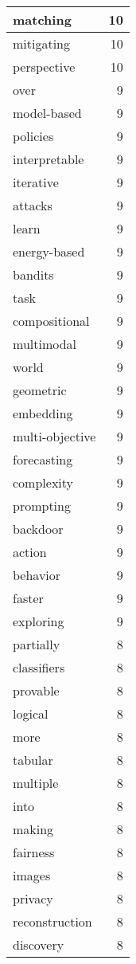\begin{table}[h]
\begin{tabular}{|l|r|}
\hline
matching & 10 \\
\hline
mitigating & 10 \\
\hline
perspective & 10 \\
\hline
over & 9 \\
\hline
model-based & 9 \\
\hline
policies & 9 \\
\hline
interpretable & 9 \\
\hline
iterative & 9 \\
\hline
attacks & 9 \\
\hline
learn & 9 \\
\hline
energy-based & 9 \\
\hline
bandits & 9 \\
\hline
task & 9 \\
\hline
compositional & 9 \\
\hline
multimodal & 9 \\
\hline
world & 9 \\
\hline
geometric & 9 \\
\hline
embedding & 9 \\
\hline
multi-objective & 9 \\
\hline
forecasting & 9 \\
\hline
complexity & 9 \\
\hline
prompting & 9 \\
\hline
backdoor & 9 \\
\hline
action & 9 \\
\hline
behavior & 9 \\
\hline
faster & 9 \\
\hline
exploring & 9 \\
\hline
partially & 8 \\
\hline
classifiers & 8 \\
\hline
provable & 8 \\
\hline
logical & 8 \\
\hline
more & 8 \\
\hline
tabular & 8 \\
\hline
multiple & 8 \\
\hline
into & 8 \\
\hline
making & 8 \\
\hline
fairness & 8 \\
\hline
images & 8 \\
\hline
privacy & 8 \\
\hline
reconstruction & 8 \\
\hline
discovery & 8 \\

\end{tabular}
\end{table}
